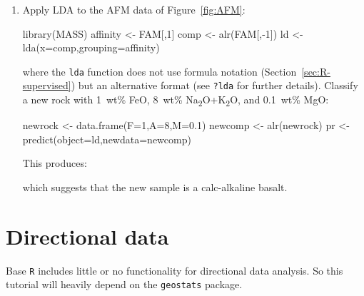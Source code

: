 \begin{enumerate}
\item Apply LDA to the AFM data of Figure~\ref{fig:AFM}:

\begin{script}
library(MASS)
affinity <- FAM[,1]
comp <- alr(FAM[,-1])
ld <- lda(x=comp,grouping=affinity)
\end{script}

\noindent where the \texttt{lda} function does not use formula
notation (Section~\ref{sec:R-supervised}) but an alternative format
(see \texttt{?lda} for further details).  Classify a new rock with
1~wt\% FeO, 8~wt\% Na\textsubscript{2}O+K\textsubscript{2}O, and
0.1~wt\% MgO:

\begin{script}[firstnumber=5]
newrock <- data.frame(F=1,A=8,M=0.1)
newcomp <- alr(newrock)
pr <- predict(object=ld,newdata=newcomp)
\end{script}

This produces:


\noindent which suggests that the new sample is a calc-alkaline
basalt.

\end{enumerate}

\section{Directional data}
\label{sec:R-directional}

Base \texttt{R} includes little or no functionality for directional
data analysis. So this tutorial will heavily depend on the
\texttt{geostats} package.

